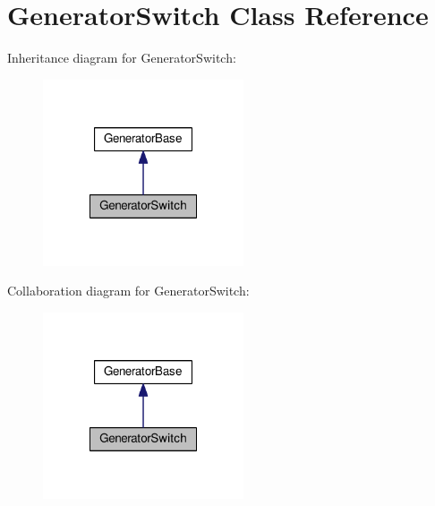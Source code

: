 \hypertarget{classGeneratorSwitch}{\section{Generator\-Switch Class Reference}
\label{classGeneratorSwitch}
}


Inheritance diagram for Generator\-Switch\-:
\nopagebreak
\begin{figure}[H]
\begin{center}
\leavevmode
\includegraphics[width=168pt]{classGeneratorSwitch__inherit__graph}
\end{center}
\end{figure}


Collaboration diagram for Generator\-Switch\-:
\nopagebreak
\begin{figure}[H]
\begin{center}
\leavevmode
\includegraphics[width=168pt]{classGeneratorSwitch__coll__graph}
\end{center}
\end{figure}

